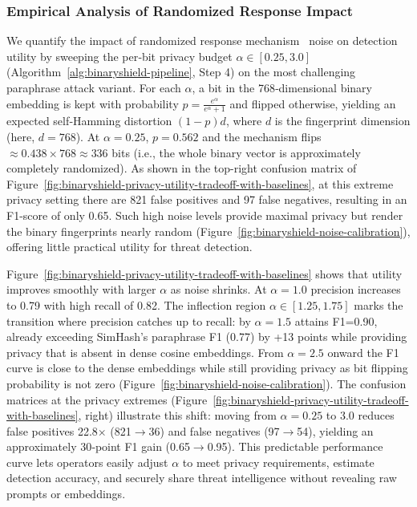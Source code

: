 \subsubsection{Empirical Analysis of Randomized Response Impact}
\label{sec:empirical-randomized-response}

We quantify the impact of randomized response mechanism~\cite{warner1965randomized} noise on detection utility by sweeping the per‑bit privacy budget $\alpha\!\in\![0.25,3.0]$ (Algorithm~\ref{alg:binaryshield-pipeline}, Step 4) on the most challenging paraphrase attack variant.
For each $\alpha$, a bit in the 768‑dimensional binary embedding is kept with probability $p=\tfrac{e^{\alpha}}{e^{\alpha}+1}$ and flipped otherwise, yielding an expected self‑Hamming distortion $(1-p)d$, where $d$ is the fingerprint dimension (here, $d=768$).
At $\alpha=0.25$, $p=0.562$ and the mechanism flips $\approx0.438\times768\approx336$ bits (i.e., the whole binary vector is approximately completely randomized).
As shown in the top-right confusion matrix of Figure~\ref{fig:binaryshield-privacy-utility-tradeoff-with-baselines}, at this extreme privacy setting there are 821 false positives and 97 false negatives, resulting in an F1-score of only 0.65.
Such high noise levels provide maximal privacy but render the binary fingerprints nearly random (Figure~\ref{fig:binaryshield-noise-calibration}), offering little practical utility for threat detection.



Figure~\ref{fig:binaryshield-privacy-utility-tradeoff-with-baselines} shows that utility improves smoothly with larger $\alpha$ as noise shrinks.
At $\alpha=1.0$ precision increases to 0.79 with high recall of 0.82.
The inflection region $\alpha\!\in\![1.25,1.75]$ marks the transition where precision catches up to recall: by $\alpha=1.5$ \tool attains F1=0.90, already exceeding SimHash’s paraphrase F1 (0.77) by +13 points while providing privacy that is absent in dense cosine embeddings.
From $\alpha=2.5$ onward the F1 curve is close to the dense embeddings while still providing privacy as bit flipping probability is not zero (Figure~\ref{fig:binaryshield-noise-calibration}).
The confusion matrices at the privacy extremes (Figure~\ref{fig:binaryshield-privacy-utility-tradeoff-with-baselines}, right) illustrate this shift: moving from $\alpha=0.25$ to $3.0$ reduces false positives 22.8$\times$ (821$\rightarrow$36) and false negatives (97$\rightarrow$54), yielding an approximately 30‑point F1 gain (0.65$\rightarrow$0.95).
This predictable performance curve lets operators easily adjust $\alpha$ to meet privacy requirements, estimate detection accuracy, and securely share threat intelligence without revealing raw prompts or embeddings.

